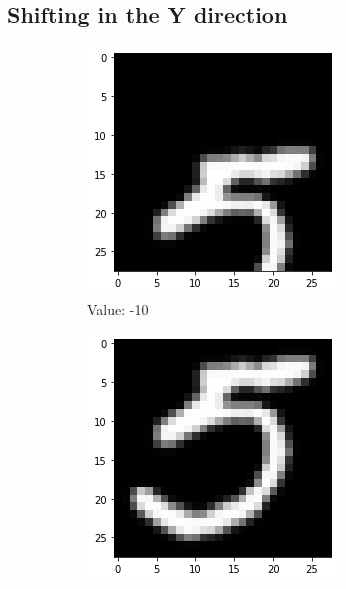 \subsection{Shifting in the Y direction}
    \begin{figure}[htb!]
        \centering
        \begin{subfigure}[b]{.3\textwidth}
            \centering
            \includegraphics[width=\linewidth]{images/shifty1.png}
            \caption{Value: -10}
            \label{fig:Rotate-misclass0}
        \end{subfigure}%
        \begin{subfigure}[b]{.3\textwidth}
            \centering
            \includegraphics[width=\textwidth]{images/shifty2.png}

\end{subfigure}
\end{figure}
